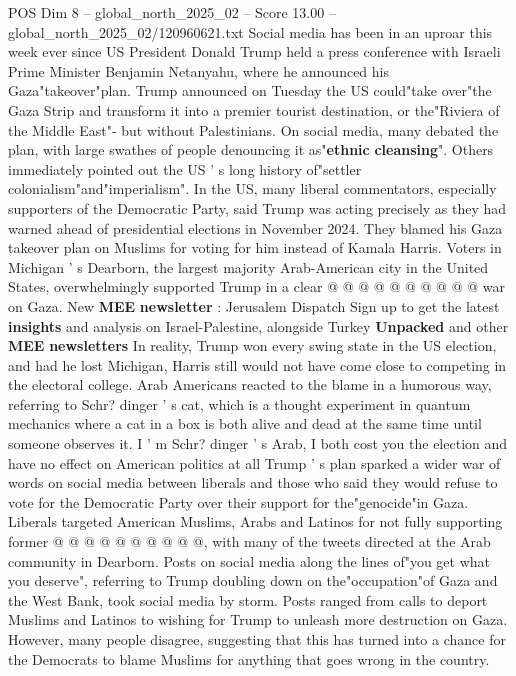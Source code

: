 \begin{textsample}{POS Dim 8 – global\_north\_2025\_02 – Score 13.00 – global\_north\_2025\_02/120960621.txt}  \label{ex:f8_pos_015}
Social media has been in an uproar this week ever since US President Donald Trump held a press conference with Israeli Prime Minister Benjamin Netanyahu, where he announced his Gaza"takeover"plan.
Trump announced on Tuesday the US could"take over"the Gaza Strip and transform it into a premier tourist destination, or the"Riviera of the Middle East"- but without Palestinians.
On social media, many debated the plan, with large swathes of people denouncing it as"\textbf{ethnic} \textbf{cleansing}".
Others immediately pointed out the US ' s long history of"settler colonialism"and"imperialism".
In the US, many liberal commentators, especially supporters of the Democratic Party, said Trump was acting precisely as they had warned ahead of presidential elections in November 2024.
They blamed his Gaza takeover plan on Muslims for voting for him instead of Kamala Harris.
Voters in Michigan ' s Dearborn, the largest majority Arab-American city in the United States, overwhelmingly supported Trump in a clear @ @ @ @ @ @ @ @ @ @ war on Gaza.
New \textbf{MEE} \textbf{newsletter} : Jerusalem Dispatch Sign up to get the latest \textbf{insights} and analysis on Israel-Palestine, alongside Turkey \textbf{Unpacked} and other \textbf{MEE} \textbf{newsletters} In reality, Trump won every swing state in the US election, and had he lost Michigan, Harris still would not have come close to competing in the electoral college.
Arab Americans reacted to the blame in a humorous way, referring to Schr? dinger ' s cat, which is a thought experiment in quantum mechanics where a cat in a box is both alive and dead at the same time until someone observes it.
I ' m Schr? dinger ' s Arab, I both cost you the election and have no effect on American politics at all Trump ' s plan sparked a wider war of words on social media between liberals and those who said they would refuse to vote for the Democratic Party over their support for the"genocide"in Gaza.
Liberals targeted American Muslims, Arabs and Latinos for not fully supporting former @ @ @ @ @ @ @ @ @ @, with many of the tweets directed at the Arab community in Dearborn.
Posts on social media along the lines of"you get what you deserve", referring to Trump doubling down on the"occupation"of Gaza and the West Bank, took social media by storm.
Posts ranged from calls to deport Muslims and Latinos to wishing for Trump to unleash more destruction on Gaza.
However, many people disagree, suggesting that this has turned into a chance for the Democrats to blame Muslims for anything that goes wrong in the country.

\end{textsample}
